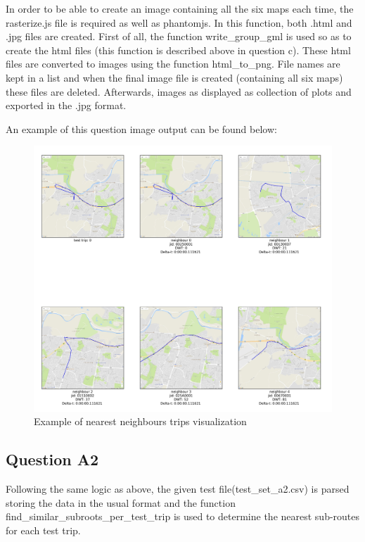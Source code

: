 \documentclass[12pt]{article}
\begin{document}
	In order to be able to create an image containing all the six maps each time, the rasterize.js file is required as well as phantomjs. In this function, both .html and .jpg files are created. First of all, the function write\_group\_gml is used so as to create the html files (this function is described above in question c). These html files are converted to images using the function html\_to\_png. File names are kept in a list and when the final image file is created (containing all six maps) these files are deleted. Afterwards, images as displayed as collection of plots and exported in the .jpg format.
	
	An example of this question image output can be found below:
	
	\begin{figure} [H]
		\begin{center}
			\includegraphics [scale = 0.50] {question2a1example.jpg}
			\caption{Example of nearest neighbours trips visualization}
		\end{center}
	\end{figure} 
	
	\subsection{Question A2}
	Following the same logic as above, the given test file(test\_set\_a2.csv) is parsed storing the data in the usual format and the function find\_similar\_subroots\_per\_test\_trip is used to determine the nearest sub-routes for each test trip.
	
\end{document}
